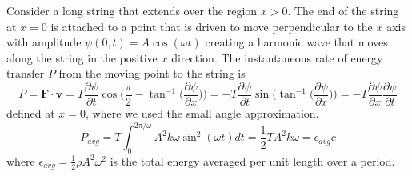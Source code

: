 \documentclass[a4paper]{article}
\begin{document}
\begin{eg}
Consider a long string that extends over the region $x>0$. The end of the string at $x=0$ is attached to a point that is driven to move perpendicular to the $x$ axis with amplitude $\psi(0,t)=A\cos(\omega t)$ creating a harmonic wave that moves along the string in the positive $x$ direction. The instantaneous rate of energy transfer $P$ from the moving point to the string is
$$P=\mathbf{F}\cdot\mathbf{v}=T\frac{\partial\psi}{\partial t}\cos\bigg(\frac{\pi}{2}-\tan^{-1}\bigg(\frac{\partial\psi}{\partial x}\bigg)\bigg)=-T\frac{\partial\psi}{\partial t}\sin\bigg(\tan^{-1}\bigg(\frac{\partial\psi}{\partial x}\bigg)\bigg)=-T\frac{\partial\psi}{\partial x}\frac{\partial\psi}{\partial t}$$
defined at $x=0$, where we used the small angle approximation.
$$P_{avg}=T\int_0^{2\pi/\omega}A^2k\omega\sin^2(\omega t)dt=\frac{1}{2}TA^2k\omega=\epsilon_{avg}c$$
where $\epsilon_{avg}=\frac{1}{2}\rho A^2\omega^2$ is the total energy averaged per unit length over a period.
\end{eg}
\end{document}
